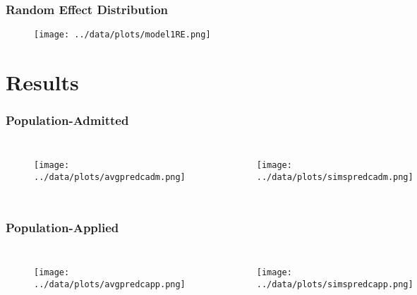 \documentclass{beamer}
\begin{document}

\begin{frame}
\frametitle{Random Effect Distribution}
\begin{figure}
\texttt{[image: ../data/plots/model1RE.png]}
\end{figure}
\end{frame}

\section{Results}

\begin{frame}
\frametitle{Population-Admitted}
\begin{columns}[c] %

\begin{figure}
\texttt{[image: ../data/plots/avgpredcadm.png]}
\end{figure}

\begin{figure}
\texttt{[image: ../data/plots/simspredcadm.png]}
\end{figure}

\end{columns}
\end{frame}


\begin{frame}
\frametitle{Population-Applied}
\begin{columns}[c] %

\begin{figure}
\texttt{[image: ../data/plots/avgpredcapp.png]}
\end{figure}

\begin{figure}
\texttt{[image: ../data/plots/simspredcapp.png]}
\end{figure}

\end{columns}
\end{frame}
\end{document}
